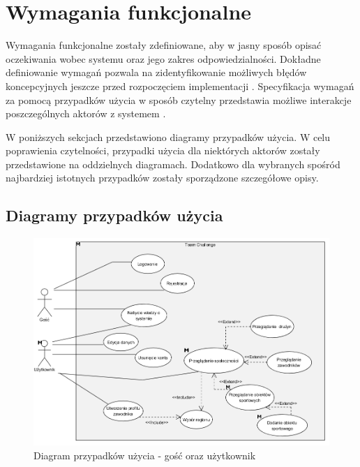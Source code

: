 \section{Wymagania funkcjonalne}

Wymagania funkcjonalne zostały zdefiniowane, aby w jasny sposób opisać oczekiwania wobec systemu oraz jego zakres odpowiedzialności. Dokładne definiowanie wymagań pozwala na zidentyfikowanie możliwych błędów koncepcyjnych jeszcze przed rozpoczęciem implementacji \cite{requirements}. Specyfikacja wymagań za pomocą przypadków użycia w sposób czytelny przedstawia możliwe interakcje poszczególnych aktorów z systemem \cite{usecase}.

W poniższych sekcjach przedstawiono diagramy przypadków użycia. W celu poprawienia czytelności, przypadki użycia dla niektórych aktorów zostały przedstawione na oddzielnych diagramach. Dodatkowo dla wybranych spośród najbardziej istotnych przypadków zostały sporządzone szczegółowe opisy.


\subsection{Diagramy przypadków użycia}

\begin{figure}[H]
\centering
\includegraphics[width=\linewidth]{04-projekt/rys/usecase1.PNG}
\caption{Diagram przypadków użycia - gość oraz użytkownik}
\label{fig:diagram-trad-alg-opt}
\end{figure}

